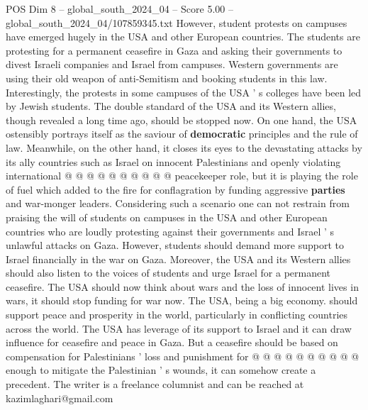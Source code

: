 \begin{textsample}{POS Dim 8 – global\_south\_2024\_04 – Score 5.00 – global\_south\_2024\_04/107859345.txt}
However, student protests on campuses have emerged hugely in the USA and other European countries.
The students are protesting for a permanent ceasefire in Gaza and asking their governments to divest Israeli companies and Israel from campuses.
Western governments are using their old weapon of anti-Semitism and booking students in this law.
Interestingly, the protests in some campuses of the USA ' s colleges have been led by Jewish students.
The double standard of the USA and its Western allies, though revealed a long time ago, should be stopped now.
On one hand, the USA ostensibly portrays itself as the saviour of \textbf{democratic} principles and the rule of law.
Meanwhile, on the other hand, it closes its eyes to the devastating attacks by its ally countries such as Israel on innocent Palestinians and openly violating international @ @ @ @ @ @ @ @ @ @ peacekeeper role, but it is playing the role of fuel which added to the fire for conflagration by funding aggressive \textbf{parties} and war-monger leaders.
Considering such a scenario one can not restrain from praising the will of students on campuses in the USA and other European countries who are loudly protesting against their governments and Israel ' s unlawful attacks on Gaza.
However, students should demand more support to Israel financially in the war on Gaza.
Moreover, the USA and its Western allies should also listen to the voices of students and urge Israel for a permanent ceasefire.
The USA should now think about wars and the loss of innocent lives in wars, it should stop funding for war now.
The USA, being a big economy. should support peace and prosperity in the world, particularly in conflicting countries across the world.
The USA has leverage of its support to Israel and it can draw influence for ceasefire and peace in Gaza.
But a ceasefire should be based on compensation for Palestinians ' loss and punishment for @ @ @ @ @ @ @ @ @ @ enough to mitigate the Palestinian ' s wounds, it can somehow create a precedent.
The writer is a freelance columnist and can be reached at kazimlaghari@gmail.com

\end{textsample}
